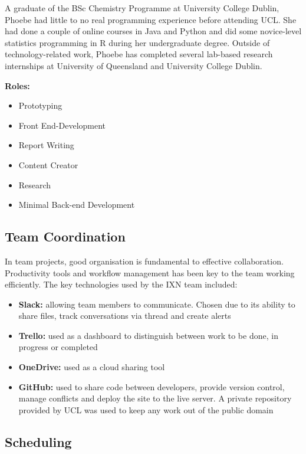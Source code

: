 \documentclass[fontsize=11pt]{extarticle}
\numberwithin{figure}{section} %
\numberwithin{table}{section}%
\providecommand{\tightlist}{%
  \setlength{\itemsep}{0pt}\setlength{\parskip}{0pt}}
\begin{document}
A graduate of the BSc Chemistry Programme at University College Dublin,
Phoebe had little to no real programming experience before attending
UCL. She had done a couple of online courses in Java and Python and did
some novice-level statistics programming in R during her undergraduate
degree. Outside of technology-related work, Phoebe has completed several
lab-based research internships at University of Queensland and
University College Dublin.

\textbf{Roles:}

\begin{itemize}
\tightlist
\item
  Prototyping
\item
  Front End-Development
\item
  Report Writing
\item
  Content Creator
\item
  Research
\item
  Minimal Back-end Development
\end{itemize}

\hypertarget{team-coordination}{%
\subsection{Team Coordination}\label{team-coordination}}

In team projects, good organisation is fundamental to effective
collaboration. Productivity tools and workflow management has been key
to the team working efficiently. The key technologies used by the IXN
team included:

\begin{itemize}
\tightlist
\item
  \textbf{Slack:} allowing team members to communicate. Chosen due to
  its ability to share files, track conversations via thread and create
  alerts
\item
  \textbf{Trello:} used as a dashboard to distinguish between work to be
  done, in progress or completed
\item
  \textbf{OneDrive:} used as a cloud sharing tool
\item
  \textbf{GitHub:} used to share code between developers, provide
  version control, manage conflicts and deploy the site to the live
  server. A private repository provided by UCL was used to keep any work
  out of the public domain
\end{itemize}

\hypertarget{scheduling}{%
\subsection{Scheduling}\label{scheduling}}
\end{document}
